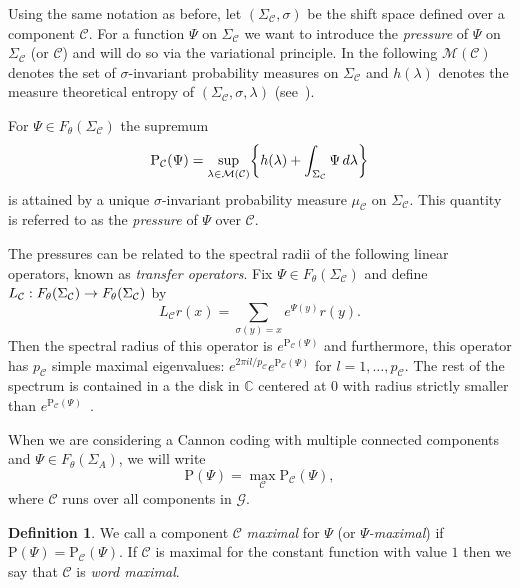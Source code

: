 \documentclass[10pt]{amsart}
\theoremstyle{definition}\newtheorem{defi}[theo]{Definition}\newtheorem{rema}[theo]{Remark}\newtheorem{exam}[theo]{Example}\newtheorem{exem}[theo]{Example}\newtheorem{nota}[theo]{Notation}
\newcommand{\m}{\mu}
\newcommand{\s}{\sigma}
\renewcommand{\SS}{\Sigma}
\renewcommand{\P}{\Psi}
\newcommand{\Cc}{\mathcal{C}}
\newcommand{\Mcc}{\mathcal{M}}
\newcommand{\Gc}{\mathcal{G}}
\newcommand{\C}{\mathbb{C}}
\renewcommand{\Pr}{\mathbb{P}}
\newcommand*\rmP{\mathrm{P}}
\let\originalleft\left
\let\originalright\right
\renewcommand{\left}{\mathopen{}\mathclose\bgroup\originalleft}
\renewcommand{\right}{\aftergroup\egroup\originalright}
\renewcommand*{\to}{\mathchoice{\longrightarrow}{\rightarrow}{\rightarrow}{\rightarrow}}
\theoremstyle{plain}
\begin{document}
Using the same notation as before, let $(\SS_\Cc, \sigma)$ be the shift space defined over a component $\Cc$. For a function $\Psi$ on $\SS_\Cc$ we want to introduce the \emph{pressure} of $\P$ on $\SS_\Cc$ (or $\Cc$) and will do so via the variational principle. In the following $\Mcc(\Cc)$ denotes the set of $\sigma$-invariant probability measures on $\SS_\Cc$ and $h(\lambda)$ denotes the measure theoretical entropy of $(\Sigma_\Cc, \sigma, \lambda)$ (see~\cite[Section~3]{ParryPollicott}).

\begin{prop}\label{prop.vp}
For $\P \in F_\theta(\Sigma_\Cc)$ the supremum
\[
\rmP_\Cc(\P) =\sup_{\lambda \in \Mcc(\Cc)}\left\{h(\lambda)+\int_{\SS_\Cc}\P\,d\lambda\right\}
\]
is attained by a unique $\sigma$-invariant probability measure $\m_\Cc$ on $\Sigma_\Cc$. This quantity is referred to as the \emph{pressure} of $\P$ over $\Cc$.
\end{prop}

The pressures can be related to the spectral radii of the following linear operators, known as \emph{transfer operators}. Fix $\P \in F_\theta(\SS_\Cc)$ and define $L_\Cc : F_\theta(\SS_\Cc) \to F_\theta(\SS_\Cc)$ by
\[
L_{\Cc} r(x) = \sum_{\s(y) = x} e^{\P(y)} r(y).
\]
Then the spectral radius of this operator is $e^{\rmP_\Cc(\P)}$ and furthermore, this operator has $p_\Cc$ simple maximal eigenvalues: $e^{2\pi i l/p_\Cc}e^{\rmP_\Cc(\P)}$ for $l =1, \dots, p_\Cc$. The rest of the spectrum is contained in a the disk in $\C$ centered at $0$ with radius strictly smaller than $e^{\rmP_\Cc(\P)}$~\cite{ParryPollicott}.

When we are considering a Cannon coding with multiple connected components and $\P \in F_\theta(\SS_A)$, we will write
\[
\rmP(\P)=\max_\Cc \rmP_\Cc(\P),
\]
where $\Cc$ runs over all components in $\Gc$.
\begin{defi}
We call a component $\Cc$ \emph{maximal} for $\P$ (or \emph{$\P$-maximal}) if $\rmP(\P)=\rmP_\Cc(\P)$. If $\Cc$ is maximal for the constant function with value $1$ then we say that $\Cc$ is \emph{word maximal}.
\end{defi}
\end{document}
